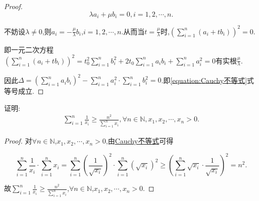 \documentclass[lang=cn,newtx,10pt,scheme=chinese]{elegantbook}
\begin{document}
\begin{proof}
\[
\lambda a_i + \mu b_i = 0,  i = 1,2,\cdots,n.
\]

不妨设\(\lambda \neq 0\),则\(a_i = -\frac{\mu}{\lambda}b_i\),\(i = 1,2,\cdots,n\).从而当\(t = \frac{\mu}{\lambda}\)时,\(\left(\sum\limits_{i = 1}^{n}(a_i + tb_i)\right)^2 = 0\).

即一元二次方程\(\left(\sum\limits_{i = 1}^{n}(a_i + tb_i)\right)^2 = t_{0}^{2}\sum\limits_{i = 1}^{n}b_{i}^{2} + 2t_0\sum\limits_{i = 1}^{n}a_ib_i + \sum\limits_{i = 1}^{n}a_{i}^{2} = 0\)有实根\(\frac{\mu}{\lambda}\).

因此\(\Delta = \left(\sum\limits_{i = 1}^{n}a_ib_i\right)^2 - \sum\limits_{i = 1}^{n}a_{i}^{2} \cdot \sum\limits_{i = 1}^{n}b_{i}^{2} = 0\).即\eqref{equation:Cauchy不等式}式等号成立.
\end{proof}

\begin{example}
   证明:\begin{align*}
      \sum\limits_{i=1}^n{\frac{1}{x_i}}\geqslant \frac{n^2}{\sum\limits_{i=1}^n{x_i}},\forall n\in \mathbb{N} ,x_1,x_2,\cdots ,x_n>0.
   \end{align*}
\end{example}
\begin{proof}
   对\(\forall n \in \mathbb{N}\),\(x_1,x_2,\cdots,x_n > 0\),由\hyperref[theorem:Cauchy不等式]{Cauchy不等式}可得

\[
\sum\limits_{i = 1}^{n}\frac{1}{x_i} \cdot \sum\limits_{i = 1}^{n}x_i = \sum\limits_{i = 1}^{n}\left(\frac{1}{\sqrt{x_i}}\right)^2 \cdot \sum\limits_{i = 1}^{n}\left(\sqrt{x_i}\right)^2 \geqslant \left(\sum\limits_{i = 1}^{n}\sqrt{x_i} \cdot \frac{1}{\sqrt{x_i}}\right)^2 = n^2.
\]

故\(\sum\limits_{i = 1}^{n}\frac{1}{x_i} \geqslant \frac{n^2}{\sum\limits_{i = 1}^{n}x_i}\),\(\forall n \in \mathbb{N}\),\(x_1,x_2,\cdots,x_n > 0\). 
\end{proof}
\end{document}
